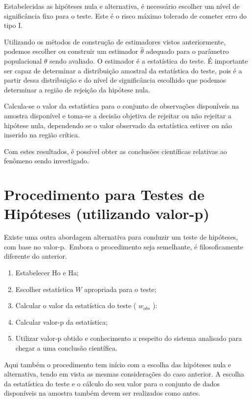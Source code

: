 \documentclass[
]{book}
\theoremstyle{definition}
\theoremstyle{definition}
\theoremstyle{definition}
\theoremstyle{remark}
\begin{document}
Estabelecidas as hipóteses nula e alternativa, é necessário escolher um nível de significância fixo para o teste. Este é o risco máximo tolerado de cometer erro do tipo I.

Utilizando os métodos de construção de estimadores vistos anteriormente, podemos escolher ou construir um estimador \(\hat\theta\) adequado para o parâmetro populacional \(\theta\) sendo avaliado. O estimador é a estatística do teste. É importante ser capaz de determinar a distribuição amostral da estatística do teste, pois é a partir dessa distribuição e do nível de significância escolhido que podemos determinar a região de rejeição da hipótese nula.

Calcula-se o valor da estatística para o conjunto de observações disponíveis na amostra disponível e toma-se a decisão objetiva de rejeitar ou não rejeitar a hipótese nula, dependendo se o valor observado da estatística estiver ou não inserido na região crítica.

Com estes resultados, é possível obter as conclusões científicas relativas ao fenômeno sendo investigado.

\hypertarget{procedimento-para-testes-de-hipuxf3teses-utilizando-valor-p}{%
\section{Procedimento para Testes de Hipóteses (utilizando valor-p)}\label{procedimento-para-testes-de-hipuxf3teses-utilizando-valor-p}}

Existe uma outra abordagem alternativa para conduzir um teste de hipóteses, com base no valor-p.~Embora o procedimento seja semelhante, é filosoficamente diferente do anterior.

\begin{enumerate}
\def\labelenumi{\arabic{enumi})}
\item
  Estabelecer Ho e Ha;
\item
  Escolher estatística \(W\) apropriada para o teste;
\item
  Calcular o valor da estatística do teste ( \(w_{obs}\) ):
\item
  Calcular valor-p da estatística;
\item
  Utilizar valor-p obtido e conhecimento a respeito do sistema analisado para chegar a uma conclusão científica.
\end{enumerate}

Aqui também o procedimento tem início com a escolha das hipóteses nula e alternativa, tendo em vista as mesmas considerações do caso anterior. A escolha da estatística do teste e o cálculo do seu valor para o conjunto de dados disponíveis na amostra também devem ser realizados como antes.
\end{document}
